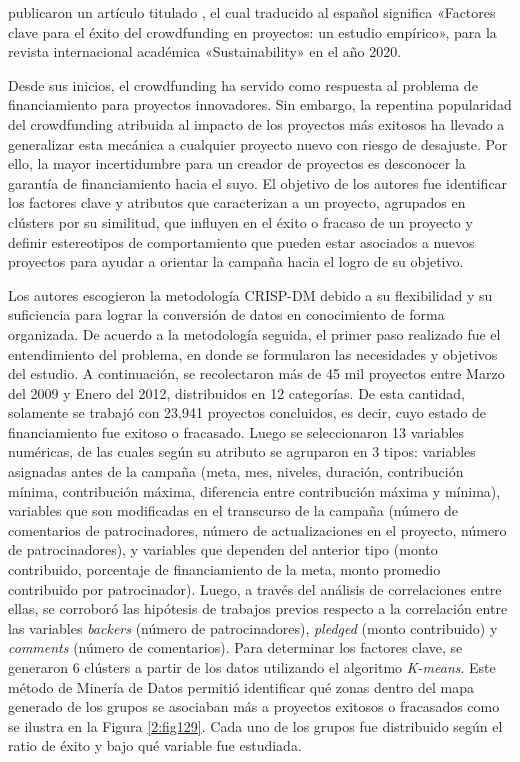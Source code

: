 \newpage
\cite{pr_fernandezblanco2020crowdfunding_empirical} publicaron un artículo titulado , el cual traducido al español significa «Factores clave para el éxito del crowdfunding en proyectos: un estudio empírico», para la revista internacional académica «Sustainability» en el año 2020.

Desde sus inicios, el crowdfunding ha servido como respuesta al problema de financiamiento para proyectos innovadores. Sin embargo, la repentina popularidad del crowdfunding atribuida al impacto de los proyectos más exitosos ha llevado a generalizar esta mecánica a cualquier proyecto nuevo con riesgo de desajuste. Por ello, la mayor incertidumbre para un creador de proyectos es desconocer la garantía de financiamiento hacia el suyo. El objetivo de los autores fue identificar los factores clave y atributos que caracterizan a un proyecto, agrupados en clústers por su similitud, que influyen en el éxito o fracaso de un proyecto y definir estereotipos de comportamiento que pueden estar asociados a nuevos proyectos para ayudar a orientar la campaña hacia el logro de su objetivo.

Los autores escogieron la metodología CRISP-DM debido a su flexibilidad y su suficiencia para lograr la conversión de datos en conocimiento de forma organizada. De acuerdo a la metodología seguida, el primer paso realizado fue el entendimiento del problema, en donde se formularon las necesidades y objetivos del estudio. A continuación, se recolectaron más de 45 mil proyectos entre Marzo del 2009 y Enero del 2012, distribuidos en 12 categorías. De esta cantidad, solamente se trabajó con 23,941 proyectos concluidos, es decir, cuyo estado de financiamiento fue exitoso o fracasado. Luego se seleccionaron 13 variables numéricas, de las cuales según su atributo se agruparon en 3 tipos: variables asignadas antes de la campaña (meta, mes, niveles, duración, contribución mínima, contribución máxima, diferencia entre contribución máxima y mínima), variables que son modificadas en el transcurso de la campaña (número de comentarios de patrocinadores, número de actualizaciones en el proyecto, número de patrocinadores), y variables que dependen del anterior tipo (monto contribuido, porcentaje de financiamiento de la meta, monto promedio contribuido por patrocinador). Luego, a través del análisis de correlaciones entre ellas, se corroboró las hipótesis de trabajos previos respecto a la correlación entre las variables \textit{backers} (número de patrocinadores), \textit{pledged} (monto contribuido) y \textit{comments} (número de comentarios). Para determinar los factores clave, se generaron 6 clústers a partir de los datos utilizando el algoritmo \textit{K-means}. Este método de Minería de Datos permitió identificar qué zonas dentro del mapa generado de los grupos se asociaban más a proyectos exitosos o fracasados como se ilustra en la Figura \ref{2:fig129}. Cada uno de los grupos fue distribuido según el ratio de éxito y bajo qué variable fue estudiada.

